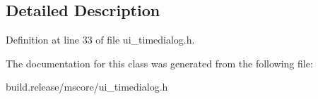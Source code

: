 \subsection{Detailed Description}


Definition at line 33 of file ui\+\_\+timedialog.\+h.



The documentation for this class was generated from the following file\+:\begin{DoxyCompactItemize}
\item 
build.\+release/mscore/ui\+\_\+timedialog.\+h\end{DoxyCompactItemize}
